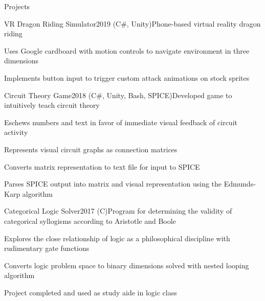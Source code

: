 \documentclass{resume} %
\begin{document}
\begin{rSection}{Projects}
\begin{rWorkSubsection}{VR Dragon Riding Simulator}{2019 (C\#, Unity)}{Phone-based virtual reality dragon riding}{}
\item Uses Google cardboard with motion controls to navigate environment in three dimensions 
\item Implements button input to trigger custom attack animations on stock sprites
\end{rWorkSubsection}\vspace{-0.5em}

\iffalse
\begin{rWorkSubsection}{Overwatch Gesture}{2019 (Java)}{Leap motion gesture control for Overwatch}{}
\item Intuitively maps Leap Motion-defined hand gestures to game inputs
\end{rWorkSubsection}\vspace{-0.5em}
\fi

\begin{rWorkSubsection}{Circuit Theory Game}{2018 (C\#, Unity, Bash, SPICE)}{Developed game to intuitively teach circuit theory}{}
\item Eschews numbers and text in favor of immediate visual feedback of circuit activity
\item Represents visual circuit graphs as connection matrices
\item Converts matrix representation to text file for input to SPICE
\item Parses SPICE output into matrix and visual representation using the Edmunds-Karp algorithm
\end{rWorkSubsection}\vspace{-0.5em}


\begin{rWorkSubsection}{Categorical Logic Solver}{2017 (C)}{Program for determining the validity of categorical syllogisms according to Aristotle and Boole}{}
\item Explores the close relationship of logic as a philosophical discipline with rudimentary gate functions
\item Converts logic problem space to binary dimensions solved with nested looping algorithm
\item Project completed and used as study aide in logic class
\end{rWorkSubsection}\vspace{-0.5em}


\end{rSection}
\end{document}
